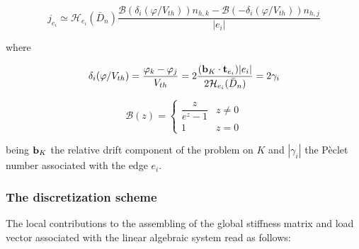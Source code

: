 \begin{equation}
j_{e_i}  \simeq \mathcal{H}_{e_i}(\bar{D}_n) \dfrac{\mathcal{B}(\delta_i(\varphi / V_{th}))n_{h,k} -  \mathcal{B}(-\delta_i(\varphi / V_{th}))n_{h,j}}{|e_i|}
\end{equation}

where 

\begin{equation}
\delta_i(\varphi / V_{th}) = \dfrac{\varphi_k - \varphi_j}{V_{th}} = 2 \dfrac{(\mathbf{b}_K\cdot \mathbf{t}_{e_i}) |e_i|}{2\mathcal{H}_{e_i}(\bar{D}_n) } = 2 \gamma_i
\end{equation}

\begin{equation}
\mathcal{B}(z) = \left\{ \begin{array}{cl}
\dfrac{z}{e^z-1} & z \neq 0
\\
1 & z = 0
\end{array}
\right.
\end{equation}

being $\mathbf{b}_K$ the relative drift component of the problem on $K$ and $|\gamma_i|$ the P\`eclet number associated with the edge $e_i$.  

\subsubsection{The discretization scheme}

The local contributions to the assembling of the global stiffness matrix and load vector associated with the linear algebraic system read as follows:

